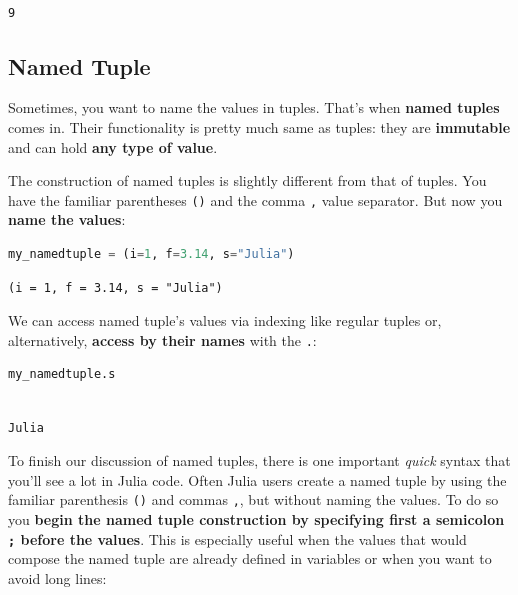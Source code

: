 \documentclass[
  notoc %
]{tufte-book}
\newcommand{\passthrough}[1]{#1}
\begin{document}
\begin{lstlisting}[language=Output]

9

\end{lstlisting}

\hypertarget{sec:namedtuple}{%
\subsection{Named Tuple}\label{sec:namedtuple}}

Sometimes, you want to name the values in tuples. That's when
\textbf{named tuples} comes in. Their functionality is pretty much same
as tuples: they are \textbf{immutable} and can hold \textbf{any type of
value}.

The construction of named tuples is slightly different from that of
tuples. You have the familiar parentheses \passthrough{\lstinline!()!}
and the comma \passthrough{\lstinline!,!} value separator. But now you
\textbf{name the values}:

\begin{lstlisting}[language=Julia]
my_namedtuple = (i=1, f=3.14, s="Julia")
\end{lstlisting}

\begin{lstlisting}[language=Output]
(i = 1, f = 3.14, s = "Julia")
\end{lstlisting}

We can access named tuple's values via indexing like regular tuples or,
alternatively, \textbf{access by their names} with the
\passthrough{\lstinline!.!}:

\begin{lstlisting}[language=Julia]
my_namedtuple.s
\end{lstlisting}

\begin{lstlisting}[language=Output]

Julia

\end{lstlisting}

To finish our discussion of named tuples, there is one important
\emph{quick} syntax that you'll see a lot in Julia code. Often Julia
users create a named tuple by using the familiar parenthesis
\passthrough{\lstinline!()!} and commas \passthrough{\lstinline!,!}, but
without naming the values. To do so you \textbf{begin the named tuple
construction by specifying first a semicolon \passthrough{\lstinline!;!}
before the values}. This is especially useful when the values that would
compose the named tuple are already defined in variables or when you
want to avoid long lines:
\end{document}
